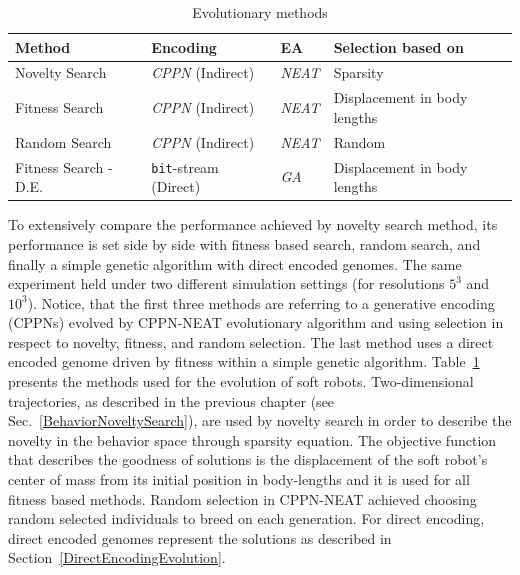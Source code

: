 \begin{table}[t!]
\centering
\caption{Evolutionary methods}
\label{EvolutionaryMethods}
    \begin{tabular}{llll}
    \toprule
    \textbf{Method} & \textbf{Encoding} & \textbf{EA} & \textbf{Selection based on}\\
    \midrule
    Novelty Search & \emph{CPPN} (Indirect)& \emph{NEAT} &  Sparsity\\
    Fitness Search & \emph{CPPN} (Indirect)& \emph{NEAT} &  Displacement in body lengths  \\
    Random Search & \emph{CPPN} (Indirect)& \emph{NEAT} & Random  \\
    Fitness Search - D.E. & \texttt{bit}-stream (Direct) & \emph{GA} & Displacement in body lengths \\
    \bottomrule
    \end{tabular}
\end{table}

To extensively compare the performance achieved by novelty search method, its performance is set side by side with fitness based search, random search, and finally a simple genetic algorithm with direct encoded genomes. The same experiment held under two different simulation settings (for resolutions $5^3$ and $10^3$). Notice, that the first three methods are referring to a generative encoding (CPPNs) evolved by CPPN-NEAT evolutionary algorithm and using selection in respect to novelty, fitness, and random selection. The last method uses a direct encoded genome driven by fitness within a simple genetic algorithm. Table~\ref{EvolutionaryMethods} presents the methods used for the evolution of soft robots. Two-dimensional trajectories, as described in the previous chapter (see Sec.~\ref{BehaviorNoveltySearch}), are used by novelty search in order to describe the novelty in the behavior space through sparsity equation. The objective function that describes the goodness of solutions is the displacement of the soft robot's center of mass from its initial position in body-lengths and it is used for all fitness based methods. Random selection in CPPN-NEAT achieved choosing random selected individuals to breed on each generation. For direct encoding, direct encoded genomes represent the solutions as described in Section~\ref{DirectEncodingEvolution}.

